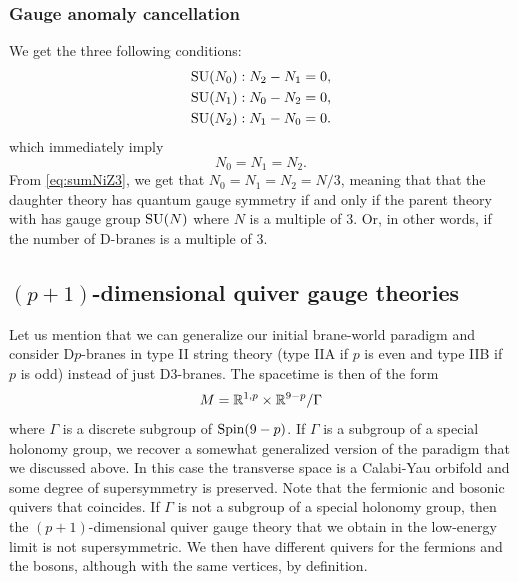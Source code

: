         \subsubsection{Gauge anomaly cancellation}
        
            We get the three following conditions:
            \begin{align}
                \text{SU}(N_0) &: N_2-N_1 = 0,\\
                \text{SU}(N_1) &: N_0-N_2 = 0,\\
                \text{SU}(N_2) &: N_1-N_0 = 0.
            \end{align}
            which immediately imply
            \begin{equation}
                N_0=N_1=N_2.
            \end{equation}
            From \eqref{eq:sumNiZ3}, we get that $N_0=N_1=N_2=N/3$, meaning that that the daughter theory has quantum gauge symmetry if and only if the parent theory with has gauge group $\text{SU}(N)$ where $N$ is a multiple of $3$. Or, in other words, if the number of D-branes is a multiple of $3$.

    \subsection{$(p+1)$-dimensional quiver gauge theories}

        Let us mention that we can generalize our initial brane-world paradigm and consider D$p$-branes in type II string theory (type IIA if $p$ is even and type IIB if $p$ is odd) instead of just D$3$-branes. The spacetime is then of the form
        \begin{equation}
            M = \mathbb{R}^{1,p}\times\mathbb{R}^{9-p}/\Gamma
        \end{equation}
        where $\Gamma$ is a discrete subgroup of $\text{Spin}(9-p)$. If $\Gamma$ is a subgroup of a special holonomy group, we recover a somewhat generalized version of the paradigm that we discussed above. In this case the transverse space is a Calabi-Yau orbifold and some degree of supersymmetry is preserved. Note that the fermionic and bosonic quivers that coincides. If $\Gamma$ is not a subgroup of a special holonomy group, then the $(p+1)$-dimensional quiver gauge theory that we obtain in the low-energy limit is not supersymmetric. We then have different quivers for the fermions and the bosons, although with the same vertices, by definition.

